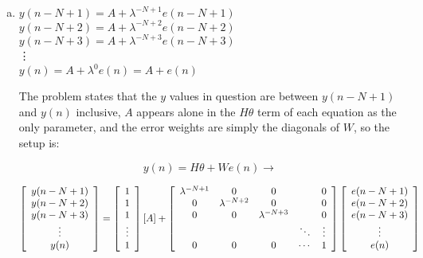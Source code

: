 \documentclass{article}
\begin{document}
\section{}
\begin{enumerate}[(a)]
\item
$y(n-N+1) = A + \lambda^{-N+1} e(n-N+1)$\\
$y(n-N+2) = A + \lambda^{-N+2} e(n-N+2)$\\
$y(n-N+3) = A + \lambda^{-N+3} e(n-N+3)$\\
\hspace{1pt} \vdots \\
$y(n) = A + \lambda^0 e(n) = A + e(n)$
\vspace{1em}

The problem states that the $y$ values in question are between $y(n-N+1)$ and 
$y(n)$ inclusive, $A$ appears alone in the $H\theta$ term of each equation as
the only parameter, and the error weights are simply the diagonals of $W$, so
the setup is:

\[
y(n) = H\theta + We(n) \rightarrow
\]

\[
\left[ \begin{array}{c}
y(n-N+1)\\
y(n-N+2)\\
y(n-N+3)\\
\vdots\\
y(n)
\end{array} \right] =
\left[ \begin{array}{c}
1\\
1\\
1\\
\vdots\\
1\\
\end{array}\right]
[A] +
\left[ \begin{array}{c c c c c}
\lambda^{-N+1} & 0 & 0 & & 0 \\
0 & \lambda^{-N+2} & 0 & & 0 \\
0 & 0 & \lambda^{-N+3} & & 0\\
& & & \ddots & \vdots \\
0 & 0 & 0 & \cdots & 1\\
\end{array} \right] 
\left[ \begin{array}{c}
e(n-N+1)\\
e(n-N+2)\\
e(n-N+3)\\
\vdots\\
e(n)
\end{array} \right]
\]


\end{enumerate}
\end{document}
